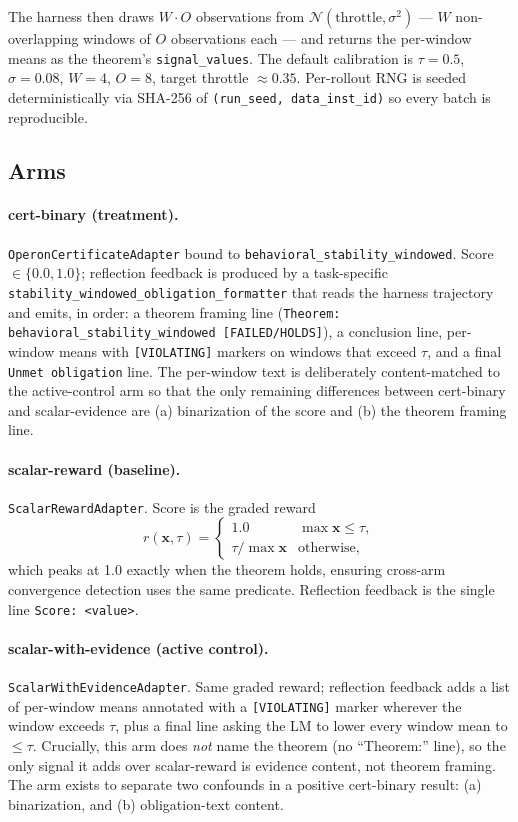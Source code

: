 The harness then draws
$W \cdot O$ observations from $\mathcal{N}(\text{throttle},
\sigma^2)$ --- $W$ non-overlapping windows of $O$ observations each
--- and returns the per-window means as the theorem's
\texttt{signal\_values}.  The default calibration is
$\tau = 0.5$, $\sigma = 0.08$, $W = 4$, $O = 8$, target throttle
$\approx 0.35$.  Per-rollout RNG is seeded deterministically via
SHA-256 of \texttt{(run\_seed, data\_inst\_id)} so every batch is
reproducible.

\subsection{Arms}\label{sec:arms}

\paragraph{cert-binary (treatment).}
\texttt{OperonCertificateAdapter} bound to
\texttt{behavioral\_stability\_windowed}.  Score
$\in \{0.0, 1.0\}$; reflection feedback is produced by a
task-specific \texttt{stability\_windowed\_obligation\_formatter}
that reads the harness trajectory and emits, in order: a theorem
framing line (\texttt{Theorem: behavioral\_stability\_windowed
[FAILED/HOLDS]}), a conclusion line, per-window means with
\texttt{[VIOLATING]} markers on windows that exceed $\tau$, and a
final \texttt{Unmet obligation} line.  The per-window text is
deliberately content-matched to the active-control arm so that the
only remaining differences between cert-binary and scalar-evidence
are (a) binarization of the score and (b) the theorem framing
line.

\paragraph{scalar-reward (baseline).}
\texttt{ScalarRewardAdapter}.  Score is the graded reward
\[
r(\mathbf{x}, \tau) = \begin{cases}
1.0 & \max \mathbf{x} \le \tau,\\
\tau / \max \mathbf{x} & \text{otherwise},
\end{cases}
\]
which peaks at 1.0 exactly when the theorem holds, ensuring
cross-arm convergence detection uses the same predicate.  Reflection
feedback is the single line \texttt{Score: <value>}.

\paragraph{scalar-with-evidence (active control).}
\texttt{ScalarWithEvidenceAdapter}.  Same graded reward; reflection
feedback adds a list of per-window means annotated with a
\texttt{[VIOLATING]} marker wherever the window exceeds $\tau$,
plus a final line asking the LM to lower every window mean to
$\le \tau$.  Crucially, this arm does \emph{not} name the theorem
(no ``Theorem:'' line), so the only signal it adds over
scalar-reward is evidence content, not theorem framing.  The arm
exists to separate two confounds in a positive cert-binary result:
(a) binarization, and (b) obligation-text content.


